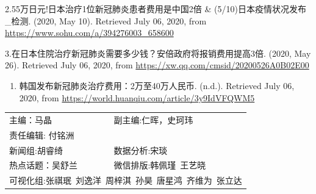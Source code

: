 \documentclass[]{article}
\providecommand{\tightlist}{%
  \setlength{\itemsep}{0pt}\setlength{\parskip}{0pt}}
\begin{document}
2.55万日元!日本治疗1位新冠肺炎患者费用是中国2倍 \&
(5/10)日本疫情状况发布\_检测. (2020, May 10). Retrieved July 06, 2020,
from \url{https://www.sohu.com/a/394276003_658600}

3.在日本住院治疗新冠肺炎需要多少钱？安倍政府将报销费用提高3倍. (2020,
May 26). Retrieved July 06, 2020, from
\url{https://xw.qq.com/cmsid/20200526A0B02E00}

\begin{enumerate}
\def\labelenumi{\arabic{enumi}.}
\setcounter{enumi}{3}
\tightlist
\item
  韩国发布新冠肺炎治疗费用：2万至40万人民币. (n.d.). Retrieved July 06,
  2020, from \url{https://world.huanqiu.com/article/3y9IdVFQWM5}
\end{enumerate}

\vspace{5mm}

\centering
\fontsize{12}{12} \selectfont

\begin{tabular}{ll}


主编：马晶  &  副主编:仁晖，史珂玮 \\
责任编辑: 付铭洲  \\
新闻组:胡睿绮  &  数据分析:宋琰 \\
热点话题：吴舒兰 & 微信排版:韩佩瑾\, 王艺晓 \\
\multicolumn{2}{l}{可视化组:张祺珉\, 刘逸洋\, 周梓淇\, 孙昊\, 唐星鸿\, 齐维为\, 张立达}

\end{tabular}
\end{document}
